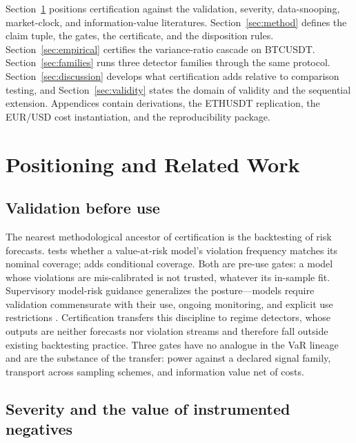 \documentclass[3p]{elsarticle}
\begin{document}
Section~\ref{sec:related} positions certification against the validation,
severity, data-snooping, market-clock, and information-value literatures.
Section~\ref{sec:method} defines the claim tuple, the gates, the certificate,
and the disposition rules. Section~\ref{sec:empirical} certifies the
variance-ratio cascade on BTCUSDT. Section~\ref{sec:families} runs three
detector families through the same protocol. Section~\ref{sec:discussion}
develops what certification adds relative to comparison testing, and
Section~\ref{sec:validity} states the domain of validity and the sequential
extension. Appendices contain derivations, the ETHUSDT replication, the
EUR/USD cost instantiation, and the reproducibility package.

\section{Positioning and Related Work}
\label{sec:related}

\subsection{Validation before use}

The nearest methodological ancestor of certification is the backtesting of
risk forecasts. \citet{Kupiec1995} tests whether a value-at-risk model's
violation frequency matches its nominal coverage; \citet{Christoffersen1998}
adds conditional coverage. Both are pre-use gates: a model whose violations
are mis-calibrated is not trusted, whatever its in-sample fit. Supervisory
model-risk guidance generalizes the posture---models require validation
commensurate with their use, ongoing monitoring, and explicit use
restrictions \citep{FederalReserveOCC2011}. Certification transfers this
discipline to regime detectors, whose outputs are neither forecasts nor
violation streams and therefore fall outside existing backtesting practice.
Three gates have no analogue in the VaR lineage and are the substance of the
transfer: power against a declared signal family, transport across sampling
schemes, and information value net of costs.

\subsection{Severity and the value of instrumented negatives}
\end{document}

